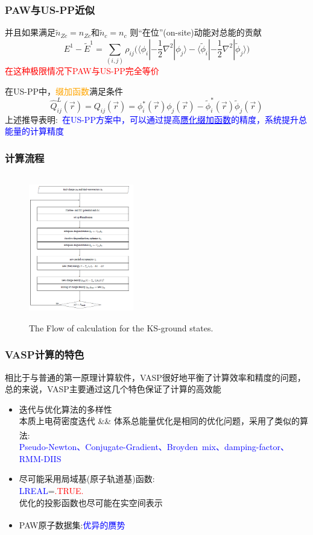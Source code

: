 \documentclass[cjk,slidestop,compress,mathserif,blue]{beamer}
\newcommand{\upcite}[1]{\hspace{0ex}\textsuperscript{\cite{#1}}} %
\begin{document}
\frame
{
	\frametitle{\textrm{PAW}与\textrm{US-PP}近似}
	并且如果满足$\tilde n_{Zc}=n_{Zc}$和$\tilde n_c=n_c$
	则“在位”(\textrm{on-site})动能对总能的贡献
	\begin{displaymath}
		E^1-\tilde E^1=\sum_{(i,j)}\rho_{ij}\big(\langle\phi_i|-\frac12\nabla^2|\phi_j\rangle-\langle\tilde\phi_i|-\frac12\nabla^2|\tilde\phi_j\rangle\big)
	\end{displaymath}
	\textcolor{red}{在这种极限情况下\textrm{PAW}与\textrm{US-PP}完全等价}

	在\textrm{US-PP}中，\textcolor{orange}{缀加函数}满足条件
	$$\hat Q_{ij}^L(\vec r)=Q_{ij}(\vec r)=\phi_i^{\ast}(\vec r)\phi_j(\vec r)-\tilde\phi_i^{\ast}(\vec r)\tilde\phi_j(\vec r)$$
	上述推导表明:~\textcolor{blue}{在\textrm{US-PP}方案中，可以通过提高\underline{赝化缀加函数}的精度，系统提升总能量的计算精度}
}

\frame
{
	\frametitle{计算流程}
\begin{figure}[h!]
	\vspace{-0.2in}
\centering
\includegraphics[height=2.5in,width=1.8in,viewport=0 0 480 630,clip]{Figures/VASP_procedure.png}
\caption{\tiny \textrm{The Flow of calculation for the KS-ground states.}}%
\label{PAW_baiseset}
\end{figure} 
}

\frame
{
	\frametitle{\textrm{VASP}计算的特色}
	相比于与普通的第一原理计算软件，\textrm{VASP}很好地平衡了计算效率和精度的问题，总的来说，\textrm{VASP}主要通过这几个特色保证了计算的高效能
	\begin{itemize}
	     \item 迭代与优化算法的多样性\\
		     本质上电荷密度迭代 \textrm{\&\&} 体系总能量优化是相同的优化问题，采用了类似的算法\upcite{CMS6-15_1996,PRB54-11169_1996}:\\
			\textcolor{blue}{\textrm{Pseudo-Newton、Conjugate-Gradient、Broyden~mix、damping-factor、RMM-DIIS}}
	     \item 尽可能采用局域基(原子轨道基)函数:~\\
		     \textcolor{blue}{\textrm{LREAL}}=\textcolor{red}{\textrm{.TRUE.}}\\
			优化的投影函数也尽可能在实空间表示
	     \item \textrm{PAW}原子数据集:\textcolor{blue}{优异的赝势}\upcite{PRB59-1758_1999}
	\end{itemize}
}
\end{document}
